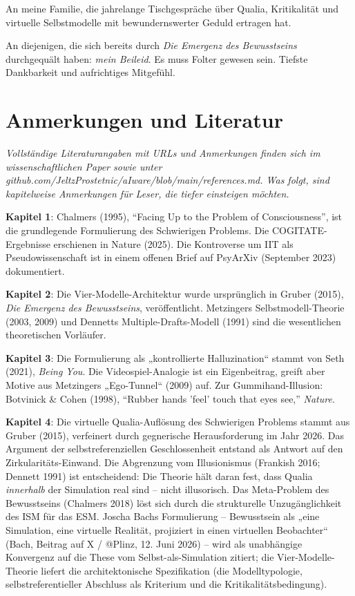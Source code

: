 \documentclass[11pt, twoside, openright]{book}
\begin{document}
An meine Familie, die jahrelange Tischgespräche über Qualia, Kritikalität und virtuelle Selbstmodelle mit bewundernswerter Geduld ertragen hat.

An diejenigen, die sich bereits durch \textit{Die Emergenz des Bewusstseins} durchgequält haben: \textit{mein Beileid}. Es muss Folter gewesen sein. Tiefste Dankbarkeit und aufrichtiges Mitgefühl.


\chapter*{Anmerkungen und Literatur}

\textit{Vollständige Literaturangaben mit URLs und Anmerkungen finden sich im wissenschaftlichen Paper sowie unter github.com/JeltzProstetnic/aIware/blob/main/references.md. Was folgt, sind kapitelweise Anmerkungen für Leser, die tiefer einsteigen möchten.}

\textbf{Kapitel 1}: Chalmers (1995), ``Facing Up to the Problem of Consciousness'', ist die grundlegende Formulierung des Schwierigen Problems. Die COGITATE-Ergebnisse erschienen in Nature (2025). Die Kontroverse um IIT als Pseudowissenschaft ist in einem offenen Brief auf PsyArXiv (September 2023) dokumentiert.

\textbf{Kapitel 2}: Die Vier-Modelle-Architektur wurde ursprünglich in Gruber (2015), \textit{Die Emergenz des Bewusstseins}, veröffentlicht. Metzingers Selbstmodell-Theorie (2003, 2009) und Dennetts Multiple-Drafts-Modell (1991) sind die wesentlichen theoretischen Vorläufer.

\textbf{Kapitel 3}: Die Formulierung als „kontrollierte Halluzination“ stammt von Seth (2021), \textit{Being You}. Die Videospiel-Analogie ist ein Eigenbeitrag, greift aber Motive aus Metzingers „Ego-Tunnel“ (2009) auf. Zur Gummihand-Illusion: Botvinick \& Cohen (1998), ``Rubber hands 'feel' touch that eyes see,'' \textit{Nature}.

\textbf{Kapitel 4}: Die virtuelle Qualia-Auflösung des Schwierigen Problems stammt aus Gruber (2015), verfeinert durch gegnerische Herausforderung im Jahr 2026. Das Argument der selbstreferenziellen Geschlossenheit entstand als Antwort auf den Zirkularitäts-Einwand. Die Abgrenzung vom Illusionismus (Frankish 2016; Dennett 1991) ist entscheidend: Die Theorie hält daran fest, dass Qualia \textit{innerhalb} der Simulation real sind -- nicht illusorisch. Das Meta-Problem des Bewusstseins (Chalmers 2018) löst sich durch die strukturelle Unzugänglichkeit des ISM für das ESM. Joscha Bachs Formulierung -- Bewusstsein als „eine Simulation, eine virtuelle Realität, projiziert in einen virtuellen Beobachter“ (Bach, Beitrag auf X / @Plinz, 12. Juni 2026) -- wird als unabhängige Konvergenz auf die These vom Selbst-als-Simulation zitiert; die Vier-Modelle-Theorie liefert die architektonische Spezifikation (die Modelltypologie, selbstreferentieller Abschluss als Kriterium und die Kritikalitätsbedingung).
\end{document}
